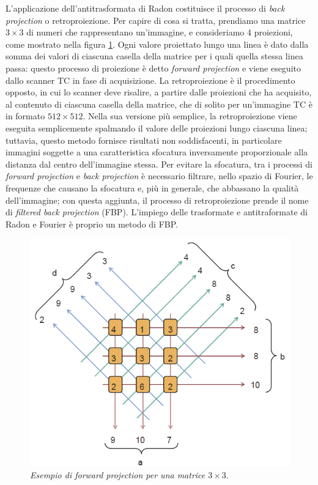 \documentclass{report}
\newcommand{\figref}[1]{figura \ref{#1}}
\numberwithin{equation}{section}
\numberwithin{figure}{section}
\begin{document}
L'applicazione dell'antitrasformata di Radon costituisce il processo di \textit{back projection} o retroproiezione. Per capire di cosa si tratta, prendiamo una matrice $3\times3$ di numeri che rappresentano un'immagine, e consideriamo 4 proiezioni, come mostrato nella \figref{fig:proiezione}. Ogni valore proiettato lungo una linea è dato dalla somma dei valori di ciascuna casella della matrice per i quali quella stessa linea passa: questo processo di proiezione è detto \textit{forward projection} e viene eseguito dallo scanner TC in fase di acquisizione. La retroproiezione è il procedimento opposto, in cui lo scanner deve risalire, a partire dalle proiezioni che ha acquisito, al contenuto di ciascuna casella della matrice, che di solito per un'immagine TC è in formato $512\times512$. Nella sua versione più semplice, la retroproiezione viene eseguita semplicemente spalmando il valore delle proiezioni lungo ciascuna linea; tuttavia, questo metodo fornisce risultati non soddisfacenti, in particolare immagini soggette a una caratteristica sfocatura inversamente proporzionale alla distanza dal centro dell'immagine stessa. Per evitare la sfocatura, tra i processi di \textit{forward projection} e \textit{back projection} è necessario filtrare, nello spazio di Fourier, le frequenze che causano la sfocatura e, più in generale, che abbassano la qualità dell'immagine; con questa aggiunta, il processo di retroproiezione prende il nome di \textit{filtered back projection} (FBP). L'impiego delle trasformate e antitraformate di Radon e Fourier è proprio un metodo di FBP.

\begin{figure}[htp]
\centering
\includegraphics[scale=0.75]{immagini/proiezione.png}
\caption{\label{fig:proiezione} \textit{Esempio di forward projection per una matrice $3\times3$}.}
\end{figure}
\end{document}
